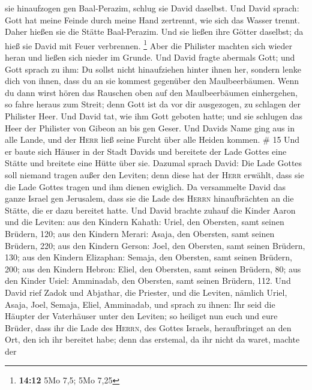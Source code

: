 sie hinaufzogen gen Baal-Perazim, schlug sie David daselbst. Und David
sprach: Gott hat meine Feinde durch meine Hand zertrennt, wie sich das
Wasser trennt. Daher hießen sie die Stätte Baal-Perazim. 
Und sie ließen ihre Götter daselbst; da hieß sie David mit Feuer
verbrennen. \footnote{\textbf{14:12} 5Mo 7,5; 5Mo 7,25} 
Aber die Philister machten sich wieder heran und ließen sich nieder im
Grunde.  Und David fragte abermals Gott; und Gott sprach
zu ihm: Du sollst nicht hinaufziehen hinter ihnen her, sondern lenke
dich von ihnen, dass du an sie kommest gegenüber den Maulbeerbäumen.
 Wenn du dann wirst hören das Rauschen oben auf den
Maulbeerbäumen einhergehen, so fahre heraus zum Streit; denn Gott ist da
vor dir ausgezogen, zu schlagen der Philister Heer.  Und
David tat, wie ihm Gott geboten hatte; und sie schlugen das Heer der
Philister von Gibeon an bis gen Geser.  Und Davids Name
ging aus in alle Lande, und der \textsc{Herr} ließ seine Furcht über
alle Heiden kommen. \# 15  Und er baute sich Häuser in der
Stadt Davids und bereitete der Lade Gottes eine Stätte und breitete eine
Hütte über sie.  Dazumal sprach David: Die Lade Gottes
soll niemand tragen außer den Leviten; denn diese hat der \textsc{Herr}
erwählt, dass sie die Lade Gottes tragen und ihm dienen ewiglich.
 Da versammelte David das ganze Israel gen Jerusalem, dass
sie die Lade des \textsc{Herrn} hinaufbrächten an die Stätte, die er
dazu bereitet hatte.  Und David brachte zuhauf die Kinder
Aaron und die Leviten:  aus den Kindern Kahath: Uriel, den
Obersten, samt seinen Brüdern, 120;  aus den Kindern
Merari: Asaja, den Obersten, samt seinen Brüdern, 220; 
aus den Kindern Gerson: Joel, den Obersten, samt seinen Brüdern, 130;
 aus den Kindern Elizaphan: Semaja, den Obersten, samt
seinen Brüdern, 200;  aus den Kindern Hebron: Eliel, den
Obersten, samt seinen Brüdern, 80;  aus den Kinder Usiel:
Amminadab, den Obersten, samt seinen Brüdern, 112.  Und
David rief Zadok und Abjathar, die Priester, und die Leviten, nämlich
Uriel, Asaja, Joel, Semaja, Eliel, Amminadab,  und sprach
zu ihnen: Ihr seid die Häupter der Vaterhäuser unter den Leviten; so
heiliget nun euch und eure Brüder, dass ihr die Lade des \textsc{Herrn},
des Gottes Israels, heraufbringet an den Ort, den ich ihr bereitet habe;
 denn das erstemal, da ihr nicht da waret, machte der
